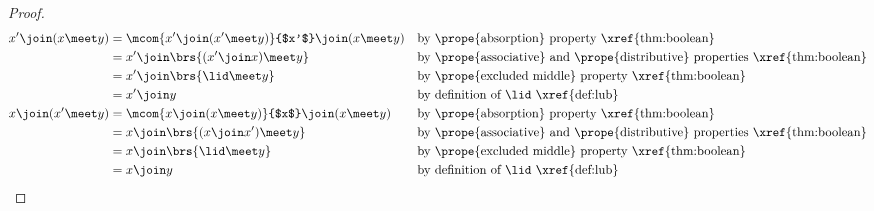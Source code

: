 \begin{lemma}%
\label{lem:boa_xcxy}
\end{lemma}
\begin{proof}
\begin{align*}
  x' \join (x\meet y) 
    &= \mcom{x'\join(x'\meet y)}{$x'$} \join (x\meet y) 
    && \text{by \prope{absorption} property \xref{thm:boolean}}
  \\&= x'\join \brs{(x' \join x)\meet y }
    && \text{by \prope{associative} and \prope{distributive} properties \xref{thm:boolean}}
  \\&= x'\join \brs{\lid\meet y}
    && \text{by \prope{excluded middle} property \xref{thm:boolean}}
  \\&= x' \join y 
    && \text{by definition of $\lid$ \xref{def:lub}}
  \\
  x \join (x'\meet y) 
    &= \mcom{x\join(x\meet y)}{$x$} \join (x\meet y) 
    && \text{by \prope{absorption} property \xref{thm:boolean}}
  \\&= x\join \brs{(x \join x')\meet y }
    && \text{by \prope{associative} and \prope{distributive} properties \xref{thm:boolean}}
  \\&= x\join \brs{\lid\meet y}
    && \text{by \prope{excluded middle} property \xref{thm:boolean}}
  \\&= x \join y 
    && \text{by definition of $\lid$ \xref{def:lub}}
\end{align*}
\end{proof}


